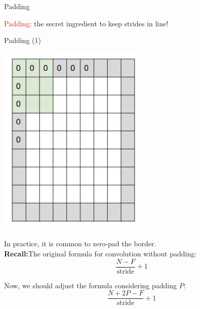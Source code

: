 \documentclass[default, aspectratio=169]{beamer}
\begin{document}
	\begin{frame}{Padding}
		\begin{center}
			\LARGE \textcolor{red}{Padding}: the secret ingredient to keep strides in line!
		\end{center}
	\end{frame}
	
	
	\begin{frame}{Padding (1)}
		
		\begin{minipage}{0.28\textwidth} %
			\includegraphics[keepaspectratio, scale=0.6]{pic/zeropad.png}
		\end{minipage}
		\begin{minipage}{0.67\textwidth} %
			In practice, it is common to zero-pad the border. \\
			\smallskip
			\textbf{Recall:}The original formula for convolution without padding:
			\[
			\frac{N - F}{\text{stride}} + 1
			\]
			
			Now, we should adjust the formula considering padding $P$:
			\[
			\frac{N + 2P - F}{\text{stride}} + 1
			\]
		\end{minipage}
	\end{frame}
\end{document}

